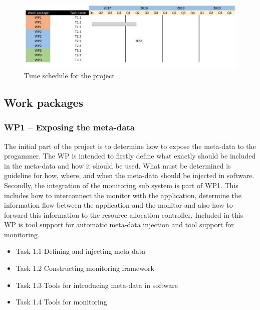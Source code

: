\documentclass{article}
\begin{document}
\begin{figure}[h]
	\centering
	\includegraphics[scale=0.45]{fig/schedule.pdf}
	\caption{Time schedule for the project}
	\label{fig:schedule}
\end{figure}

\subsection{Work packages}
\subsubsection{WP1 -- Exposing the meta-data}
The initial part of the project is to determine how to expose the meta-data to the progammer.
The WP is intended to firstly define what exactly should be included in the meta-data and how it should be used.
What must be determined is guideline for how, where, and when the meta-data should be injected in software.
Secondly, the integration of the monitoring sub system is part of WP1.
This includes how to interconnect the monitor with the application, determine the information flow between the application and the monitor and also how to forward this information to the resource allocation controller.
Included in this WP is tool support for automatic meta-data injection and tool support for monitoring.
\begin{itemize}
 \item Task 1.1 Defining and injecting meta-data \vspace{-0.3cm}
 \item Task 1.2 Constructing monitoring framework \vspace{-0.3cm}
 \item Task 1.3 Tools for introducing meta-data in software \vspace{-0.3cm}
 \item Task 1.4 Tools for monitoring
\end{itemize}
\end{document}
